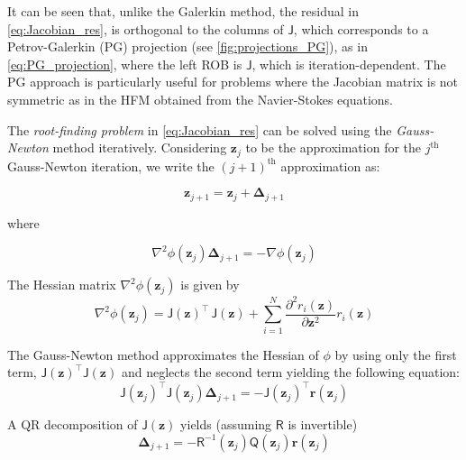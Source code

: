 \documentclass[11pt]{article}
\renewcommand{\vec}[1]{\mathbf{#1}}
\newcommand{\mat}[1]{\mathsf{#1}}
\begin{document}
        It can be seen that, unlike the Galerkin method, the residual in \cref{eq:Jacobian_res}, is orthogonal to the columns of $\mat{J}$, which corresponds to a Petrov-Galerkin (PG) projection \cite{Carlberg_2017Galerkin} (see \cref{fig:projections_PG}), as in \cref{eq:PG_projection}, where the left ROB  is $\mat{J}$, which is iteration-dependent.
        The PG approach is particularly useful for problems where the Jacobian matrix is not symmetric as in the HFM obtained from  the Navier-Stokes equations.


        The \textit{root-finding problem } in \cref{eq:Jacobian_res} can be solved using the \textit{Gauss-Newton} method \cite{stanford_cme345,carlberg2013gnat} iteratively.
        Considering $\vec{z}_j$ to be the approximation for the  $j^{\text{th}}$ Gauss-Newton iteration, we write the  $(j+1)^{\text{th}}$ approximation as:

        \begin{equation}
        \vec{z}_{j+1} = \vec{z}_{j} + \boldsymbol{\Delta}_{j+1}
        \label{eq:GaussNewton_app}
        \end{equation}

        where

        \begin{equation}
        \nabla^2\phi(\vec{z}_j)\boldsymbol{\Delta}_{j+1} = -\nabla\phi(\vec{z}_j)
        \label{eq:Gauss_newton_step}
        \end{equation}

        The Hessian matrix $\nabla^2\phi(\vec{z}_j)$ is given by
        \begin{equation}
        \nabla^2\phi(\vec{z}_j) = \mat{J}(\vec{z})^{\top}\,\mat{J}(\vec{z})+ \sum_{i=1}^{N} \frac{\partial^2 r_i(\mathbf{z})}{\partial \mathbf{z}^2} r_i(\mathbf{z})
        \label{eq:Gauss_newton_step}
        \end{equation}


        The Gauss-Newton method approximates the Hessian of $\phi$ by using only the first term, $\mat{J}(\vec{z})^{\top} \mat{J}(\vec{z})$ and neglects the second term yielding the following equation:
        \begin{equation}
        \mat{J}(\mathbf{z}_{j})^{\top} \mat{J}(\mathbf{z}_{j}) \boldsymbol{\Delta}_{j+1} = -\mat{J}(\mathbf{z}_{j})^{\top} \mathbf{r}(\mathbf{z}_{j})
        \label{eq:normal_J}
        \end{equation}

        A QR decomposition of $\mat{J}(\vec{z})$ yields (assuming $\mat{R}$ is invertible)
        \begin{equation}
        \boldsymbol{\Delta}_{j+1} = - \mat{R}^{-1}(\vec{z}_j)\mat{Q}(\vec{z}_j)\mathbf{r}(\mathbf{z}_{j})
        \label{eq:normal_J2}
        \end{equation}
\end{document}
